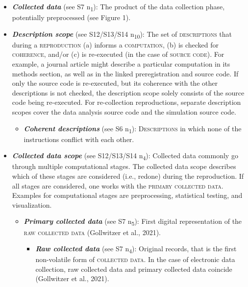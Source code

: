 \documentclass[authordate, meta]{jote-new-article}
\begin{document}
	\begin{itemize}[label=\phantom{\textbullet},topsep=0pt]
		\item \emph{\textbf{Collected data}} (see S7 \rightarrow{ }n\textsubscript{1}): The product of the data collection phase, potentially preprocessed (see Figure 1).
		\item \emph{\textbf{Description scope}} (see S12/S13/S14 \rightarrow{ }n\textsubscript{10}): The set of \textsc{descriptions} that during a \textsc{reproduction} (a) informs a \textsc{computation}, (b) is checked for \textsc{coherence}, and/or (c) is re-executed (in the case of \textsc{source code}). For example, a journal article might describe a particular computation in its methods section, as well as in the linked preregistration and source code. If only the source code is re-executed, but its coherence with the other descriptions is not checked, the description scope solely consists of the source code being re-executed. For re-collection reproductions, separate description scopes cover the data analysis source code and the simulation source code.
		\begin{itemize}[label=\phantom{\textbullet}]
			\item \emph{\textbf{Coherent descriptions}} (see S6 \rightarrow{ }n\textsubscript{1}): \textsc{Descriptions} in which none of the instructions conflict with each other.
		\end{itemize}
		\item \emph{\textbf{Collected data scope}} (see S12/S13/S14 \rightarrow{ }n\textsubscript{4}): Collected data commonly go through multiple computational stages. The collected data scope describes which of these stages are considered (i.e., redone) during the reproduction. If all stages are considered, one works with the \textsc{primary collected data}. Examples for computational stages are preprocessing, statistical testing, and visualization.
		\begin{itemize}[label=\phantom{\textbullet}]
			\item \emph{\textbf{Primary collected data}} (see S7 \rightarrow{ }n\textsubscript{5}): First digital representation of the \textsc{raw collected data} (Gollwitzer et al., 2021).
			\begin{itemize}[label=\phantom{\textbullet}]
			\item \emph{\textbf{Raw collected data}} (see S7 \rightarrow{ }n\textsubscript{4}): Original records, that is the first non-volatile form of \textsc{collected data}. In the case of electronic data collection, raw collected data and primary collected data coincide (Gollwitzer et al., 2021).
			\end{itemize}
		\end{itemize}
	\end{itemize}
	
\end{document}
